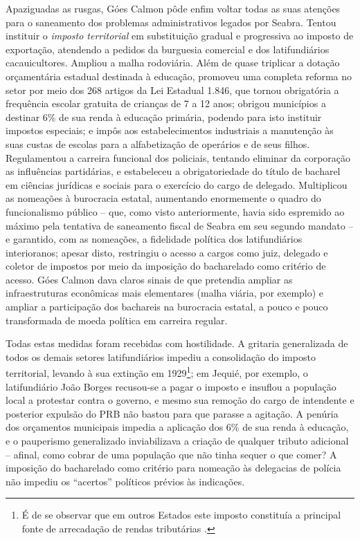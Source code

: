 Apaziguadas as rusgas, Góes Calmon pôde enfim voltar todas as suas atenções para o saneamento dos problemas administrativos legados por Seabra. Tentou instituir o \textit{imposto territorial} em substituição gradual e progressiva ao imposto de exportação, atendendo a pedidos da burguesia comercial e dos latifundiários cacauicultores. Ampliou a malha rodoviária. Além de quase triplicar a dotação orçamentária estadual destinada à educação, promoveu uma completa reforma no setor por meio dos 268 artigos da Lei Estadual 1.846, que tornou obrigatória a frequência escolar gratuita de crianças de 7 a 12 anos; obrigou municípios a destinar 6\% de sua renda à educação primária, podendo para isto instituir impostos especiais; e impôs aos estabelecimentos industriais a manutenção às suas custas de escolas para a alfabetização de operários e de seus filhos. Regulamentou a carreira funcional dos policiais, tentando eliminar da corporação as influências partidárias, e estabeleceu a obrigatoriedade do título de bacharel em ciências jurídicas e sociais para o exercício do cargo de delegado. Multiplicou as nomeações à burocracia estatal, aumentando enormemente o quadro do funcionalismo público -- que, como visto anteriormente, havia sido espremido ao máximo pela tentativa de saneamento fiscal de Seabra em seu segundo mandato -- e garantido, com as nomeações, a fidelidade política dos latifundiários interioranos; apesar disto, restringiu o acesso a cargos como juiz, delegado e coletor de impostos por meio da imposição do bacharelado como critério de acesso. Góes Calmon dava claros sinais de que pretendia ampliar as infraestruturas econômicas mais elementares (malha viária, por exemplo) e ampliar a participação dos bachareis na burocracia estatal, a pouco e pouco transformada de moeda política em carreira regular.

Todas estas medidas foram recebidas com hostilidade. A gritaria generalizada de todos os demais setores latifundiários impediu a consolidação do imposto territorial, levando à sua extinção em 1929\footnote{É de se observar que em outros Estados este imposto constituía a principal fonte de arrecadação de rendas tributárias \cite[p.~160]{sampaio_partidos_1978}.}; em Jequié, por exemplo, o latifundiário João Borges recusou-se a pagar o imposto e insuflou a população local a protestar contra o governo, e mesmo sua remoção do cargo de intendente e posterior expulsão do PRB não bastou para que parasse a agitação. A penúria dos orçamentos municipais impedia a aplicação dos 6\% de sua renda à educação, e o pauperismo generalizado inviabilizava a criação de qualquer tributo adicional -- afinal, como cobrar de uma população que não tinha sequer o que comer? A imposição do bacharelado como critério para nomeação às delegacias de polícia não impediu os ``acertos'' políticos prévios às indicações.

